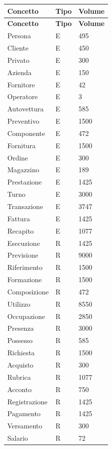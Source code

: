 			\begin{longtable}{| p{4cm} | p{4cm} | p{4cm} |}


				\hline
				\textbf{Concetto} & 
				\textbf{Tipo} & 
				\textbf{Volume} \\
				\hline
				
				\endfirsthead
				
				\hline
				\textbf{Concetto} & 
				\textbf{Tipo} & 
				\textbf{Volume} \\
				\hline
				\endhead
				
				Persona       & E & 495  \\ \hline
				Cliente       & E & 450  \\ \hline
				Privato       & E & 300  \\ \hline
				Azienda       & E & 150  \\ \hline
				Fornitore     & E & 42   \\ \hline
				Operatore     & E & 3    \\ \hline
				Autovettura   & E & 585  \\ \hline
				Preventivo    & E & 1500 \\ \hline
				Componente    & E & 472  \\ \hline
				Fornitura     & E & 1500 \\ \hline
				Ordine        & E & 300  \\ \hline
				Magazzino     & E & 189  \\ \hline
				Prestazione   & E & 1425 \\ \hline
				Turno         & E & 3000 \\ \hline
				Transazione   & E & 3747 \\ \hline
				Fattura       & E & 1425 \\ \hline
				Recapito      & E & 1077 \\ \hline
				Esecuzione    & R & 1425 \\ \hline
				Previsione    & R & 9000 \\ \hline
				Riferimento   & R & 1500 \\ \hline
				Formazione    & R & 1500 \\ \hline
				Composizione  & R & 472  \\ \hline
				Utilizzo      & R & 8550 \\ \hline
				Occupazione   & R & 2850 \\ \hline
				Presenza      & R & 3000 \\ \hline
				Possesso      & R & 585  \\ \hline
				Richiesta     & R & 1500 \\ \hline
				Acquisto      & R & 300  \\ \hline
				Rubrica       & R & 1077 \\ \hline
				Acconto       & R & 750  \\ \hline
				Registrazione & R & 1425 \\ \hline
				Pagamento     & R & 1425 \\ \hline
				Versamento    & R & 300  \\ \hline
				Salario       & R & 72   \\ \hline
				
			\end{longtable}
			
